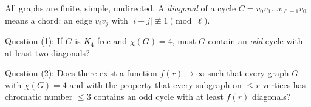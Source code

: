 All graphs are finite, simple, undirected.
A \emph{diagonal} of a cycle $C=v_0v_1\dots v_{\ell-1}v_0$ means a chord: an edge $v_iv_j$ with $|i-j|\not\equiv 1 \pmod \ell$.

Question (1): If $G$ is $K_4$-free and $\chi(G)=4$, must $G$ contain an \emph{odd} cycle with at least two diagonals?

Question (2): Does there exist a function $f(r)\to\infty$ such that every graph $G$ with $\chi(G)=4$ and with the property that every subgraph on $\le r$ vertices has chromatic number $\le 3$ contains an odd cycle with at least $f(r)$ diagonals?
